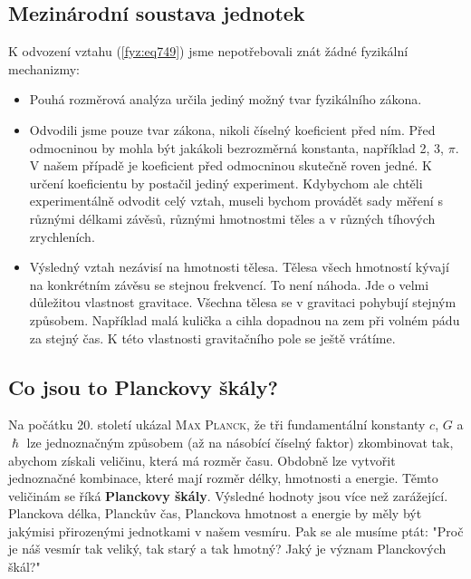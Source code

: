     \subsection{Mezinárodní soustava jednotek}\label{fyz:IchapIsecIXssecII}

      
      \begin{tcnote}
        K odvození vztahu (\ref{fyz:eq749}) jsme nepotřebovali znát žádné fyzikální mechanizmy:
        \begin{itemize}[leftmargin=10pt, noitemsep]
          \item Pouhá rozměrová analýza určila jediný možný tvar fyzikálního zákona.
          \item Odvodili jsme pouze tvar zákona, nikoli číselný koeficient před ním. Před odmocninou
                by mohla být jakákoli bezrozměrná konstanta, například \num{2}, \num{3}, \(π\). V
                našem případě je koeficient před odmocninou skutečně roven jedné. K určení
                koeficientu by postačil jediný experiment. Kdybychom ale chtěli experimentálně
                odvodit celý vztah, museli bychom provádět sady měření s různými délkami závěsů,
                různými hmotnostmi těles a v různých tíhových zrychleních.
          \item Výsledný vztah nezávisí na hmotnosti tělesa. Tělesa všech hmotností kývají na
                konkrétním závěsu se stejnou frekvencí. To není náhoda. Jde o velmi důležitou
                vlastnost gravitace. Všechna tělesa se v gravitaci pohybují stejným způsobem.
                Například malá kulička a cihla dopadnou na zem při volném pádu za stejný čas. K této
                vlastnosti gravitačního pole se ještě vrátíme. 
        \end{itemize}
      \end{tcnote}

    \subsection{Co jsou to Planckovy škály?}\label{fyz:IchapIsecIXssecI}
      Na počátku 20. století ukázal \textsc{Max Planck}, že tři fundamentální konstanty \(c\), \(G\)
      a \(\hslash\) lze jednoznačným způsobem (až na násobící číselný faktor) zkombinovat tak,
      abychom získali veličinu, která má rozměr času. Obdobně lze vytvořit jednoznačné kombinace,
      které mají rozměr délky, hmotnosti a energie. Těmto veličinám se říká \textbf{Planckovy
      škály}. Výsledné hodnoty jsou více než zarážející. Planckova délka, Planckův čas, Planckova
      hmotnost a energie by měly být jakýmisi přirozenými jednotkami v našem vesmíru. Pak se ale
      musíme ptát: "Proč je náš vesmír tak veliký, tak starý a tak hmotný? Jaký je význam
      Planckových škál?"

